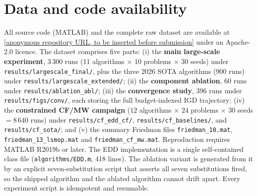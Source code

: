 \section*{Data and code availability}

All source code (MATLAB) and the complete raw
dataset are available at
\url{[anonymous repository URL, to be inserted
before submission]} under an Apache-2.0 licence.
The dataset comprises five parts:
(i) the \textbf{main large-scale experiment},
$3\,300$ runs
(11 algorithms $\times$ 10 problems $\times$ 30
seeds) under
\texttt{results/largescale\_final/}, plus the three
2026 SOTA
algorithms ($900$ runs) under
\texttt{results/largescale\_extended/}; (ii) the
\textbf{component ablation}, 60 runs under
\texttt{results/ablation\_abl/}; (iii) the
\textbf{convergence study}, 396 runs under
\texttt{results/figs/conv/}, each storing the
full budget-indexed IGD trajectory; (iv) the
\textbf{constrained CF/MW campaign} ($12$
algorithms $\times$ $24$ problems $\times$
$30$ seeds $= 8\,640$ runs) under
\texttt{results/cf\_edd\_cf/},
\texttt{results/cf\_baselines/}, and
\texttt{results/cf\_sota/}; and (v) the
summary Friedman files
\texttt{friedman\_10.mat},
\texttt{friedman\_13\_lsmop.mat}
and \texttt{friedman\_cf\_mw.mat}.
Reproduction requires MATLAB R2019b
or later. The EDD implementation
is a single self-contained class file
(\texttt{algorithms/EDD.m}, 418 lines).
The ablation variant is generated
from it by an explicit seven-substitution
script that asserts all seven
substitutions fired, so the shipped
algorithm and the ablated algorithm
cannot drift apart. Every experiment
script is idempotent and resumable.
